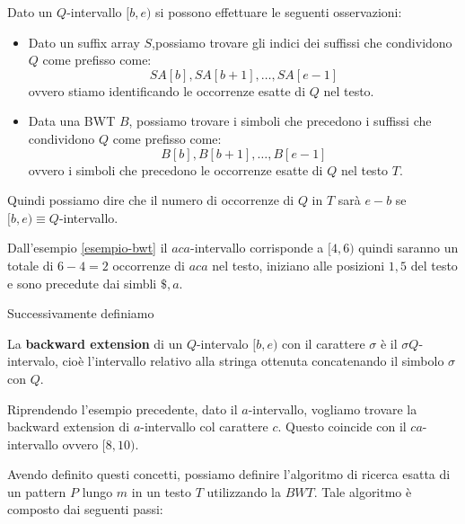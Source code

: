 Dato un $Q$-intervallo $[b, e)$ si possono effettuare le seguenti osservazioni:
\begin{itemize}
    \item Dato un suffix array $S$,possiamo trovare gli indici dei suffissi
          che condividono $Q$ come prefisso come:
          \begin{equation}
              SA[b], SA[b + 1], \dots, SA[e - 1]
          \end{equation}
          ovvero stiamo identificando le occorrenze esatte di $Q$ nel testo.
    \item Data una BWT $B$, possiamo trovare i simboli che precedono i suffissi
          che condividono $Q$ come prefisso come:
          \begin{equation}
              B[b], B[b + 1], \dots, B[e - 1]
          \end{equation}
          ovvero i simboli che precedono le occorrenze esatte di $Q$ nel testo 
          $T$.
\end{itemize}
Quindi possiamo dire che il numero di occorrenze di $Q$ in $T$ sarà $e-b$ se 
$[b,e) \equiv Q$-intervallo.
\begin{esempio}
    Dall'esempio \ref{esempio-bwt} il $aca$-intervallo corrisponde a $[4,6)$ 
    quindi saranno un totale di $6 - 4= 2$ occorrenze di $aca$ nel testo, 
    iniziano alle posizioni $1,5$ del testo e sono precedute dai simbli $\$,a$.
\end{esempio}
Successivamente definiamo
\begin{definizione}
    La \textbf{backward extension} di un $Q$-intervalo $[b,e)$ con il carattere
    $\sigma$ è il $\sigma Q$-intervalo, cioè l'intervallo relativo alla stringa
    ottenuta concatenando il simbolo $\sigma$ con $Q$.
\end{definizione}
\begin{esempio}
    Riprendendo l'esempio precedente, dato il $a$-intervallo, vogliamo trovare la
    backward extension di $a$-intervallo col carattere $c$. Questo coincide con
    il  $ca$-intervallo ovvero $[8,10)$.
\end{esempio}
Avendo definito questi concetti, possiamo definire l'algoritmo di ricerca esatta
di un pattern $P$ lungo $m$ in un testo $T$ utilizzando la $BWT$. Tale algoritmo
è composto dai seguenti passi:
